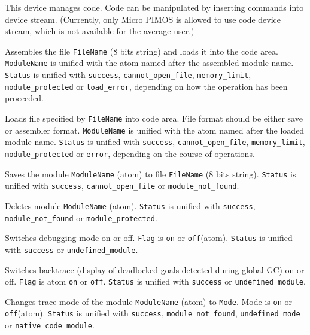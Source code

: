 \newpage
{}

This device manages code. Code can be manipulated by inserting
commands into device stream. (Currently, only Micro PIMOS
is allowed to use code device stream, which is not available for the average
user.)
\begin{itemize}

Assembles the file \verb|FileName| (8 bits string) and
loads it into the code area. \verb|ModuleName| is unified with the atom named
after the assembled module name. \verb|Status| is unified with \verb|success|,
\verb|cannot_open_file|, \verb|memory_limit|, \verb|module_protected|
or \verb|load_error|, depending on how the operation has been proceeded.

Loads file specified by \verb|FileName| into code area. File format should
be either save or assembler format. \verb|ModuleName| is unified
with the atom named after the loaded module name. \verb|Status| is unified with
\verb|success|, \verb|cannot_open_file|, \verb|memory_limit|,
\verb|module_protected| or \verb|error|, depending on the course of operations.

Saves the module \verb|ModuleName| (atom) to file
\verb|FileName| (8 bits string).
\verb|Status| is unified with \verb|success|,
\verb|cannot_open_file| or \verb|module_not_found|.

Deletes module \verb|ModuleName| (atom). \verb|Status| is unified
with \verb|success|, \verb|module_not_found| or \verb|module_protected|.

Switches debugging mode on or off. \verb|Flag| is \verb|on|
or \verb|off|(atom).  \verb|Status| is unified with \verb|success|
or \verb|undefined_module|.

Switches backtrace (display of deadlocked goals detected
during global GC) on or off.  \verb|Flag| is atom \verb|on| or \verb|off|.
\verb|Status| is unified with \verb|success| or \verb|undefined_module|.

Changes trace mode of the module \verb|ModuleName| (atom) to
\verb|Mode|.  Mode is \verb|on| or \verb|off|(atom). \verb|Status| is
unified with \verb|success|, \verb|module_not_found|, \verb|undefined_mode|
or \verb|native_code_module|.


\end{itemize}
